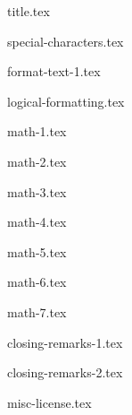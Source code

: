 \documentclass[allauthors,dutch]{../../cursuspresentatie}
\def\importslide#1#2{%
	{#2}
}
\begin{document}
\importslide{beginners_NL}{title.tex}


\importslide{beginners_NL}{special-characters.tex}


\importslide{beginners_NL}{format-text-1.tex}

\importslide{beginners_NL}{logical-formatting.tex}



\importslide{beginners_NL}{math-1.tex}

\importslide{beginners_NL}{math-2.tex}


\importslide{beginners_NL}{math-3.tex}

\importslide{beginners_NL}{math-4.tex}

\importslide{beginners_NL}{math-5.tex}

\importslide{beginners_NL}{math-6.tex}

\importslide{beginners_NL}{math-7.tex}


\importslide{beginners_NL}{closing-remarks-1.tex}
\importslide{beginners_NL}{closing-remarks-2.tex}
	
\importslide{misc}{misc-license.tex}
\end{document}

